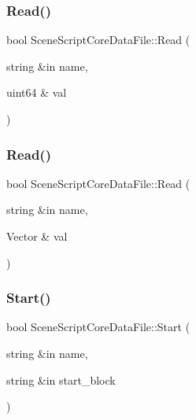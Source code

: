 \hypertarget{class_scene_script_core_data_file_af0aa8b6231ac3dede97b87b38863611f}{}\label{class_scene_script_core_data_file_af0aa8b6231ac3dede97b87b38863611f} 
\subsubsection{\texorpdfstring{Read()}{Read()}\hspace{0.1cm}{\footnotesize\ttfamily [7/8]}}
{\footnotesize\ttfamily bool Scene\+Script\+Core\+Data\+File\+::\+Read (\begin{DoxyParamCaption}\item[{string \&in}]{name,  }\item[{uint64 \&}]{val }\end{DoxyParamCaption})}

\hypertarget{class_scene_script_core_data_file_ad3312cbaf50c5b433162101bd07095de}{}\label{class_scene_script_core_data_file_ad3312cbaf50c5b433162101bd07095de} 
\subsubsection{\texorpdfstring{Read()}{Read()}\hspace{0.1cm}{\footnotesize\ttfamily [8/8]}}
{\footnotesize\ttfamily bool Scene\+Script\+Core\+Data\+File\+::\+Read (\begin{DoxyParamCaption}\item[{string \&in}]{name,  }\item[{Vector \&}]{val }\end{DoxyParamCaption})}

\hypertarget{class_scene_script_core_data_file_ad8bcdfe2d2d733aad4774a6bc71f056f}{}\label{class_scene_script_core_data_file_ad8bcdfe2d2d733aad4774a6bc71f056f} 
\subsubsection{\texorpdfstring{Start()}{Start()}\hspace{0.1cm}{\footnotesize\ttfamily [1/2]}}
{\footnotesize\ttfamily bool Scene\+Script\+Core\+Data\+File\+::\+Start (\begin{DoxyParamCaption}\item[{string \&in}]{name,  }\item[{string \&in}]{start\+\_\+block }\end{DoxyParamCaption})}


